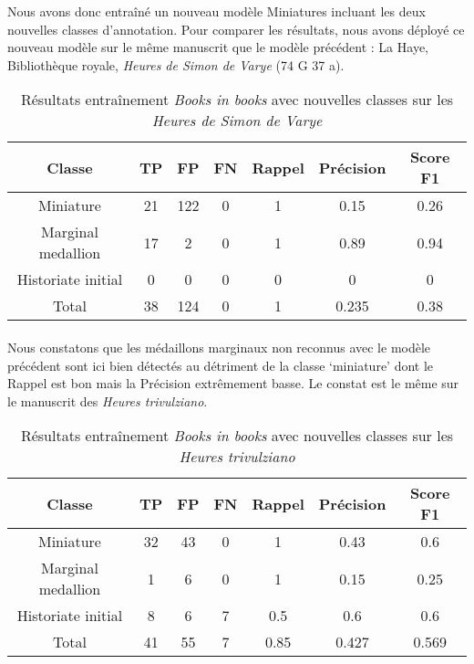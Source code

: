 \documentclass[12pt,twoside]{book}
\begin{document}
Nous avons donc entraîné un nouveau modèle Miniatures incluant les deux nouvelles classes d'annotation. Pour comparer les résultats, nous avons déployé ce nouveau modèle sur le même manuscrit que le modèle précédent : La Haye, Bibliothèque royale, \textit{Heures de Simon de Varye} (74 G 37 a). 

\begin{table}[ht]
    \centering
    \begin{tabular}{|c|c|c|c|c|c|c|}
    \hline
    \textbf{Classe} & \textbf{TP} & \textbf{FP} & \textbf{FN} & \textbf{Rappel} & \textbf{Précision} & \textbf{Score F1} \\
    \hline
    Miniature & 21 & 122 & 0 & 1 & 0.15 & 0.26 \\ 
    \hline
    Marginal medallion & 17 & 2 & 0 & 1 & 0.89 & 0.94 \\ 
    \hline
    Historiate initial & 0 & 0 & 0 & 0 & 0 & 0 \\ 
    \hline
    Total & 38 & 124 & 0 & 1 & 0.235 & 0.38 \\
    \hline
    \end{tabular}
    \vspace{0.5cm}  %
    \caption{Résultats entraînement \textit{Books in books} avec nouvelles classes sur les \textit{Heures de Simon de Varye}}
\end{table}

\paragraph{}
Nous constatons que les médaillons marginaux non reconnus avec le modèle précédent sont ici bien détectés au détriment de la classe ‘miniature’ dont le Rappel est bon mais la Précision extrêmement basse. Le constat est le même sur le manuscrit des \textit{Heures trivulziano}.  \\

\begin{table}[ht]
    \centering
    \begin{tabular}{|c|c|c|c|c|c|c|}
    \hline
    \textbf{Classe} & \textbf{TP} & \textbf{FP} & \textbf{FN} & \textbf{Rappel} & \textbf{Précision} & \textbf{Score F1} \\
    \hline
    Miniature & 32 & 43 & 0 & 1 & 0.43 & 0.6 \\ 
    \hline
    Marginal medallion & 1 & 6 & 0 & 1 & 0.15 & 0.25 \\ 
    \hline
    Historiate initial & 8 & 6 & 7 & 0.5 & 0.6 & 0.6 \\ 
    \hline
    Total & 41 & 55 & 7 & 0.85 & 0.427 & 0.569 \\
    \hline
    \end{tabular}
    \vspace{0.5cm}  %
    \caption{Résultats entraînement \textit{Books in books} avec nouvelles classes sur les \textit{Heures trivulziano}}
\end{table}
\end{document}

